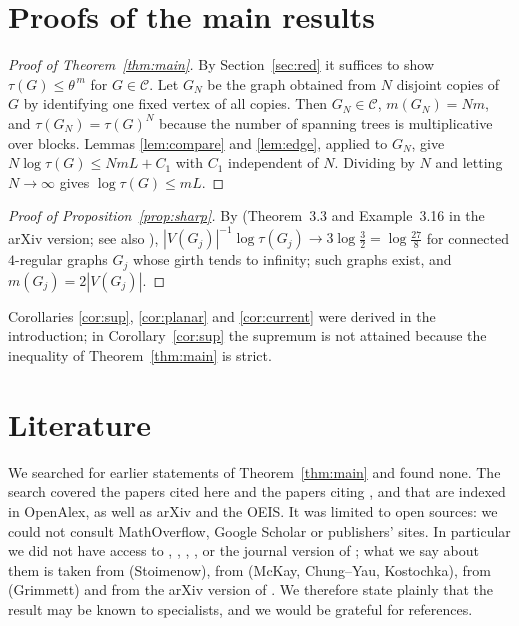 \documentclass[11pt]{amsart}
\theoremstyle{plain}
\theoremstyle{remark}
\newcommand{\cC}{\mathcal{C}}
\newcommand{\tht}{\theta}
\begin{document}
\section{Proofs of the main results}\label{sec:proof}

\begin{proof}[Proof of Theorem~\ref{thm:main}]
By Section~\ref{sec:red} it suffices to show $\tau(G)\le\tht^{\,m}$ for $G\in\cC$. Let $G_N$ be the graph obtained
from $N$ disjoint copies of $G$ by identifying one fixed vertex of all copies. Then $G_N\in\cC$,
$m(G_N)=Nm$, and $\tau(G_N)=\tau(G)^N$ because the number of spanning trees is multiplicative over blocks.
Lemmas \ref{lem:compare} and \ref{lem:edge}, applied to $G_N$, give $N\log\tau(G)\le NmL+C_1$ with $C_1$ independent
of $N$. Dividing by $N$ and letting $N\to\infty$ gives $\log\tau(G)\le mL$.
\end{proof}

\begin{proof}[Proof of Proposition~\ref{prop:sharp}]
By \cite{Lyons} (Theorem~3.3 and Example~3.16 in the arXiv version; see also \cite{McKay,ChungYau}),
$|V(G_j)|^{-1}\log\tau(G_j)\to3\log\frac32=\log\frac{27}8$
for connected $4$-regular graphs $G_j$ whose girth tends to infinity; such graphs exist, and $m(G_j)=2|V(G_j)|$.
\end{proof}

Corollaries \ref{cor:sup}, \ref{cor:planar} and \ref{cor:current} were derived in the introduction; in
Corollary~\ref{cor:sup} the supremum is not attained because the inequality of Theorem~\ref{thm:main} is strict.

\section{Literature}\label{sec:lit}

We searched for earlier statements of Theorem~\ref{thm:main} and found none. The search covered the papers cited
here and the papers citing \cite{Kenyon}, \cite{Stoimenow} and \cite{CKP} that are indexed in OpenAlex, as well as
arXiv and the OEIS. It was limited to open sources: we could not consult MathOverflow, Google Scholar or
publishers' sites. In particular we did not have access to \cite{Stoimenow}, \cite{McKay}, \cite{ChungYau},
\cite{Grimmett}, \cite{Kostochka} or the journal version of \cite{Kenyon}; what we say about them is taken from
\cite{CKP,GJKLZ} (Stoimenow), from \cite{GIKM,Lyons} (McKay, Chung--Yau, Kostochka), from \cite{ShrockWu}
(Grimmett) and from the arXiv version of \cite{Kenyon}. We therefore state plainly that the result may be known to
specialists, and we would be grateful for references.
\end{document}
